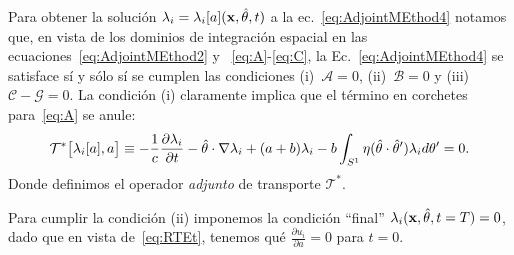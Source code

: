 Para obtener la solución  $\lambda_i=\lambda_i[a](\mathbf{x},\hat{\theta},t)$ 
a la ec.~\eqref{eq:AdjointMEthod4} notamos que, en vista 
de los dominios de integración espacial en las ecuaciones~\eqref{eq:AdjointMEthod2} 
y ~\eqref{eq:A}-\eqref{eq:C}, la Ec.~\eqref{eq:AdjointMEthod4} 
se satisface sí y sólo sí se cumplen 
las condiciones (i)~$\mathcal{A}=0$, (ii)~$\mathcal{B}=0$ y
(iii)~$\mathcal{C}-\mathcal{G}=0$. La condición (i) claramente implica 
que el término en corchetes para~\eqref{eq:A} se anule:
\begin{equation}
\mathcal{T}^*\big[\lambda_i[a],a\big] \equiv -\frac{1}
{c}\frac{\partial \lambda_i}{\partial t} 
- \hat{\theta} \cdot \nabla \lambda_i+ (a+b)\lambda_i 
- b\int_{S^1}
\eta(\hat{\theta}\cdot\hat{\theta} ') \lambda_i d\theta'=0.
\label{condA}
\end{equation}
Donde definimos el operador {\em adjunto} de transporte $\mathcal{T}^*$.

Para cumplir la condición (ii) imponemos la condición ``final'' $\lambda_i(\mathbf{x},\hat{\theta},t=T)=0$, 
dado que en vista de~\eqref{eq:RTEt}, tenemos qué $\frac{\partial u_i}{\partial a} = 0$ 
para $t=0$. 

